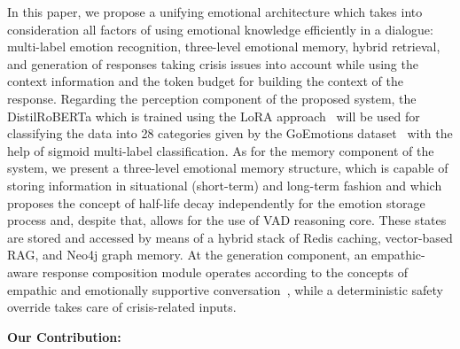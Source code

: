 \documentclass[graybox]{svmult}
\begin{document}
In this paper, we propose a unifying emotional architecture which takes into consideration all factors of using emotional knowledge efficiently in a dialogue: multi-label emotion recognition, three-level emotional memory, hybrid retrieval, and generation of responses taking crisis issues into account while using the context information and the token budget for building the context of the response. Regarding the perception component of the proposed system, the DistilRoBERTa which is trained using the LoRA approach~\cite{hu2021lora} will be used for classifying the data into 28 categories given by the GoEmotions dataset~\cite{demszky2020goemotions} with the help of sigmoid multi-label classification. As for the memory component of the system, we present a three-level emotional memory structure, which is capable of storing information in situational (short-term) and long-term fashion and which proposes the concept of half-life decay independently for the emotion storage process and, despite that, allows for the use of VAD reasoning core. These states are stored and accessed by means of a hybrid stack of Redis caching, vector-based RAG, and Neo4j graph memory. At the generation component, an empathic-aware response composition module operates according to the concepts of empathic and emotionally supportive conversation~\cite{rashkin2019empathetic,liu2021esconv}, while a deterministic safety override takes care of crisis-related inputs. \linebreak

\textbf{Our Contribution:} 
\end{document}

